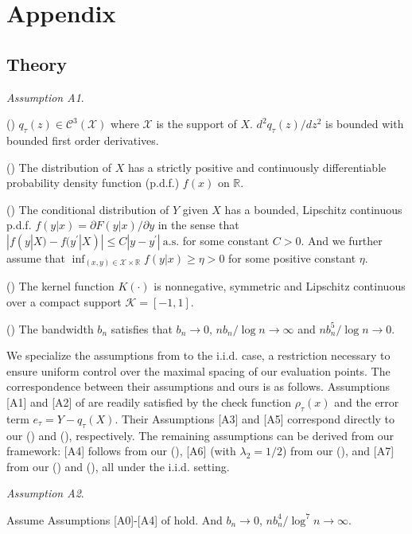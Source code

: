 \documentclass[lineno]{biometrika}
\begin{document}



\section{Appendix}

\subsection{Theory}

\textit{Assumption A1}.

() $q_\tau(z)\in \mathcal{C}^3(\mathcal{X})$ where $\mathcal{X}$ is the support of $X$. $d^2 q_\tau(z)/d z^2$ is bounded with bounded first order derivatives.

() The distribution of $X$ has a strictly positive and continuously differentiable probability density function (p.d.f.) $f(x)$ on $\mathbb{R}$.

() The conditional distribution of $Y$ given $X$ has a bounded, Lipschitz continuous p.d.f. $f(y|x)=\partial F(y|x)/\partial y$ in the sense that $|f(y|X)-f(y^\prime|X)|\le C|y-y^\prime|\ \text{a.s.}$ for some constant $C>0$. And we further assume that $\inf_{(x,y)\in\mathcal{X}\times\mathbb{R}}f(y|x)\ge\eta>0$ for some positive constant $\eta$.  

() The kernel function $K(\cdot)$ is nonnegative, symmetric and Lipschitz continuous over a compact support $\mathcal{K}=[-1,1]$.

() The bandwidth $b_n$ satisfies that $b_n\to 0$, $nb_n/\log n\to \infty$ and $nb_n^5/\log n\to0$.

\begin{remark}
    We specialize the assumptions from \cite{kong2010uniform} to the i.i.d. case, a restriction necessary to ensure uniform control over the maximal spacing of our evaluation points. The correspondence between their assumptions and ours is as follows. Assumptions [A1] and [A2] of \cite{kong2010uniform} are readily satisfied by the check function $\rho_\tau(x)$ and the error term $e_\tau=Y-q_\tau(X)$. Their Assumptions [A3] and [A5] correspond directly to our () and (), respectively. The remaining assumptions can be derived from our framework: [A4] follows from our (), [A6] (with $\lambda_2=1/2$) from our (), and [A7] from our () and (), all under the i.i.d. setting.
\end{remark} 

\textit{Assumption A2}.

Assume Assumptions [A0]-[A4] of \cite{wu2017nonparametric} hold. And $b_n\to 0$, $nb_n^4/\log^7 n\to \infty$.
\end{document}
